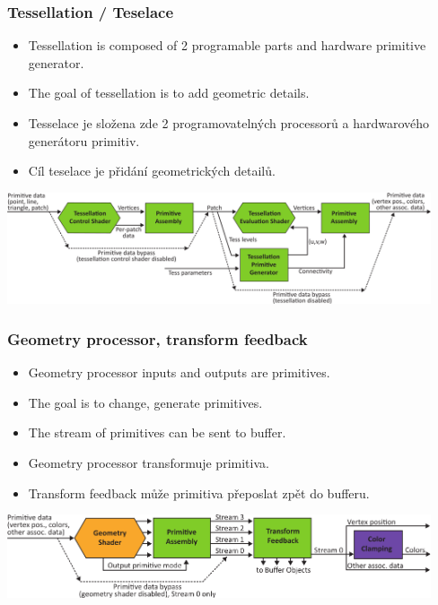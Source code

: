 \begin{frame}
\frametitle{Tessellation / Teselace}
  \scriptsize
	\begin{itemize}
		\item Tessellation is composed of 2 programable parts and hardware primitive generator.
    \item The goal of tessellation is to add geometric details.
	\end{itemize}
	\begin{itemize}
		\item Tesselace je složena zde 2 programovatelných processorů a hardwarového generátoru primitiv.
    \item Cíl teselace je přidání geometrických detailů.
	\end{itemize}
	\includegraphics[width=12.5cm,keepaspectratio]{pics/pipeline/OpenGL460PipelineTessellationShaders}
\end{frame}

\begin{frame}
\frametitle{Geometry processor, transform feedback}
  \scriptsize
	\begin{itemize}
		\item Geometry processor inputs and outputs are primitives.
    \item The goal is to change, generate primitives.
    \item The stream of primitives can be sent to buffer.
	\end{itemize}
	\begin{itemize}
		\item Geometry processor transformuje primitiva.
    \item Transform feedback může primitiva přeposlat zpět do bufferu.
	\end{itemize}
	\includegraphics[width=12.5cm,keepaspectratio]{pics/pipeline/OpenGL460PipelineGeometryShader}
\end{frame}

